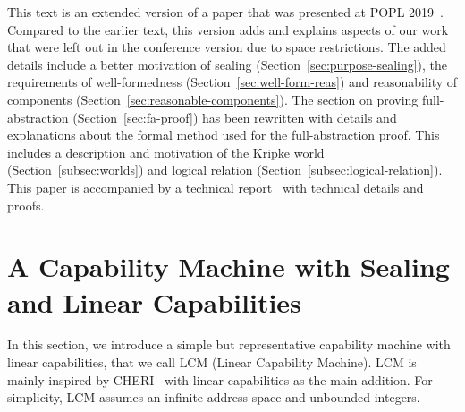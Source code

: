 \documentclass[acmsmall,screen]{acmart}\settopmatter{}
\newcommand{\trgcm}{\textsc{LCM}}
\renewcommand{\sectionname}{Section}
\newenvironment{jversion}%
    {\color{OliveGreen}}{}
\begin{document}
\begin{jversion}
  This text is an extended version of a paper that was presented at POPL 2019~\citep{skorstengaard_stktokens_2019}.
  Compared to the earlier text, this version adds and explains aspects of our work that were left out in the conference version due to space restrictions.
  The added details include a better motivation of sealing (\sectionname~\ref{sec:purpose-sealing}), the requirements of well-formedness (\sectionname~\ref{sec:well-form-reas}) and reasonability of components (\sectionname~\ref{sec:reasonable-components}).
  The section on proving full-abstraction (\sectionname~\ref{sec:fa-proof}) has been rewritten with details and explanations about the formal method used for the full-abstraction proof.
  This includes a description and motivation of the Kripke world (\sectionname~\ref{subsec:worlds}) and logical relation (\sectionname~\ref{subsec:logical-relation}).
  This paper is accompanied by a technical report~\citep{technical_report_popl} with technical details and proofs.
\end{jversion}



\section{A Capability Machine with Sealing and Linear Capabilities}
\label{sec:cap-mach-w-seal-and-lin}
In this section, we introduce a simple but representative capability machine with linear capabilities, that we call \trgcm{} (Linear Capability Machine).
\trgcm{} is mainly inspired by CHERI~\citep{watson_cheri_2015} with linear capabilities as the main addition.
For simplicity, \trgcm{} assumes an infinite address space and unbounded integers.
\end{document}
